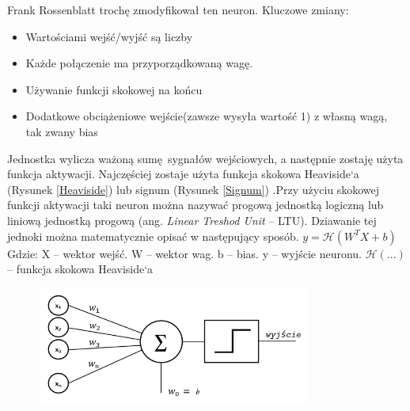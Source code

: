 \documentclass{article}
\begin{document}
Frank Rossenblatt trochę zmodyfikował ten neuron.\newline
Kluczowe zmiany:
\begin{itemize}
	\item Wartościami wejść/wyjść są liczby
	\item Każde połączenie ma przyporządkowaną wagę.
	\item Używanie funkcji skokowej na końcu
	\item Dodatkowe obciążeniowe wejście(zawsze wysyła wartość 1) z własną wagą, tak zwany bias
\end{itemize}
Jednostka wylicza ważoną sumę sygnałów wejściowych, a następnie zostaję użyta funkcja aktywacji. Najczęściej zostaje użyta funkcja skokowa Heaviside`a (Rysunek \ref{Heaviside}) lub signum (Rysunek \ref{Signum}) .Przy użyciu skokowej funkcji aktywacji taki neuron można nazywać progową jednostką logiczną lub liniową jednostką progową (ang. \textit{Linear Treshod Unit} -- LTU). Dziawanie tej jednoki można matematycznie opisać w następujący sposób.\newline\newline
$ y = \mathcal{H}(W^{T}X + b) $\newline \newline
Gdzie: \newline
X -- wektor wejść. \newline
W -- wektor wag. \newline
b -- bias. \newline
y -- wyjście neuronu. \newline
$ \mathcal{H}(...) $ -- funkcja skokowa Heaviside`a\newline

\begin{figure}[H]
	\centering
	\includegraphics[width=0.8\textwidth,keepaspectratio=true]{neuron_rosenblatta}
\end{figure}




\end{document}
